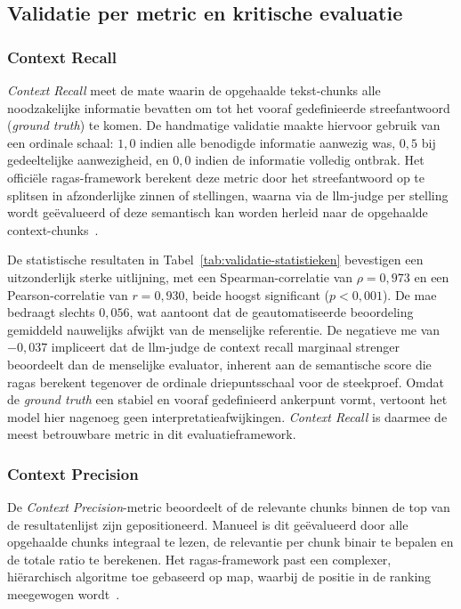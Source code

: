 \subsection{Validatie per metric en kritische evaluatie}
\label{subsec:validatie-per-metric}

\subsubsection{Context Recall}

\textit{Context Recall} meet de mate waarin de opgehaalde tekst-chunks alle noodzakelijke informatie bevatten om tot het vooraf gedefinieerde streefantwoord (\textit{ground truth}) te komen. De handmatige validatie maakte hiervoor gebruik van een ordinale schaal: $1{,}0$ indien alle benodigde informatie aanwezig was, $0{,}5$ bij gedeeltelijke aanwezigheid, en $0{,}0$ indien de informatie volledig ontbrak. Het officiële \gls{ragas}-framework berekent deze metric door het streefantwoord op te splitsen in afzonderlijke zinnen of stellingen, waarna via de \gls{llm}-judge per stelling wordt geëvalueerd of deze semantisch kan worden herleid naar de opgehaalde context-chunks~\autocite{VibrantLabs2025}.

De statistische resultaten in Tabel~\ref{tab:validatie-statistieken} bevestigen een uitzonderlijk sterke uitlijning, met een Spearman-correlatie van $\rho = 0{,}973$ en een Pearson-correlatie van $r = 0{,}930$, beide hoogst significant ($p < 0{,}001$). De \gls{mae} bedraagt slechts $0{,}056$, wat aantoont dat de geautomatiseerde beoordeling gemiddeld nauwelijks afwijkt van de menselijke referentie. De negatieve \gls{me} van $-0{,}037$ impliceert dat de \gls{llm}-judge de context recall marginaal strenger beoordeelt dan de menselijke evaluator, inherent aan de semantische score die \gls{ragas} berekent tegenover de ordinale driepuntsschaal voor de steekproef. Omdat de \textit{ground truth} een stabiel en vooraf gedefinieerd ankerpunt vormt, vertoont het model hier nagenoeg geen interpretatieafwijkingen. \textit{Context Recall} is daarmee de meest betrouwbare metric in dit evaluatieframework.

\subsubsection{Context Precision}

De \textit{Context Precision}-metric beoordeelt of de relevante chunks binnen de top van de resultatenlijst zijn gepositioneerd. Manueel is dit geëvalueerd door alle opgehaalde chunks integraal te lezen, de relevantie per chunk binair te bepalen en de totale ratio te berekenen. Het \gls{ragas}-framework past een complexer, hiërarchisch algoritme toe gebaseerd op \gls{map}, waarbij de positie in de ranking meegewogen wordt~\autocite{VibrantLabs2025}.

